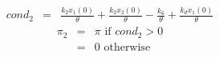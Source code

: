 \documentclass{bmcart}
\begin{document}
\begin{eqnarray*}
cond_2 &  = &  \frac{k_{2} x_1 (0)}{\theta} + \frac{k_{2} x_2 (0)}{\theta} - \frac{k_{6}}{\theta} + \frac{k_{d} x_1 (0)}{\theta}
\end{eqnarray*}
\begin{eqnarray*}
\pi_2 & = & \pi \text{ if } cond_2 > 0 \\
& = & 0 \text { otherwise}
\end{eqnarray*}


\end{document}
